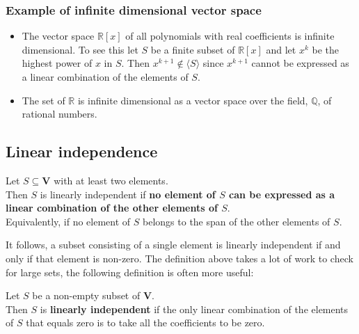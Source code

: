 \documentclass[a4paper, 9pt]{extarticle}
\begin{document}
\subsubsection*{Example of infinite dimensional vector space}
\begin{itemize}
  \item The vector space $\mathbb{R}[x]$ of all polynomials with real coefficients is infinite dimensional. To see this let $S$ be a finite subset of $\mathbb{R}[x]$ and let $x^k$ be the highest power of $x $ in $S$. Then $x^{k+1} \notin \langle S \rangle$ since $x^{k+1}$ cannot be expressed as a linear combination of the elements of $S$.
  \item The set of $\mathbb{R}$ is infinite dimensional as a vector space over the field, $\mathbb{Q}$, of rational numbers.
\end{itemize}
\subsection{Linear independence}
\begin{definitionbox}{}{}
  Let $S \subseteq \mathbf{V}$ with at least two elements. \\[2ex]
  Then $S$ is linearly independent if \textbf{no element of $S$ can be expressed as a linear combination of the other elements of $S$}. \\[2ex]
  Equivalently, if no element of $S$ belongs to the span of the other elements of $S$.
\end{definitionbox}
It follows, a subset consisting of a single element is linearly independent if and only if that element is non-zero. The definition above takes a lot of work to check for large sets, the following definition is often more useful:
\begin{definitionbox}{}{}
  Let $S$ be a non-empty subset of $\mathbf{V}$.\\[2ex]
  Then $S$ is \textbf{linearly independent} if the only linear combination of the elements of $S$ that equals zero is to take all the coefficients to be zero.
\end{definitionbox}
\end{document}
